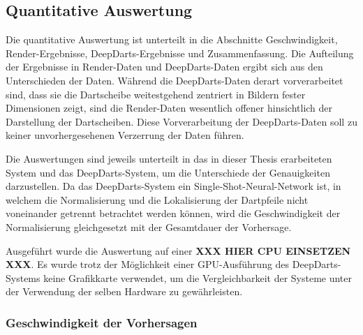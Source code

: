 
\subsection{Quantitative Auswertung}
\label{sec:cv_quantitative_auswertung}

Die quantitative Auswertung ist unterteilt in die Abschnitte Geschwindigkeit, Render-Ergebnisse, DeepDarts-Ergebnisse und Zusammenfassung. Die Aufteilung der Ergebnisse in Render-Daten und DeepDarts-Daten ergibt sich aus den Unterschieden der Daten. Während die DeepDarts-Daten derart vorverarbeitet sind, dass sie die Dartscheibe weitestgehend zentriert in Bildern fester Dimensionen zeigt, sind die Render-Daten wesentlich offener hinsichtlich der Darstellung der Dartscheiben. Diese Vorverarbeitung der DeepDarts-Daten soll zu keiner unvorhergesehenen Verzerrung der Daten führen.

Die Auswertungen sind jeweils unterteilt in das in dieser Thesis erarbeiteten System und das DeepDarts-System, um die Unterschiede der Genauigkeiten darzustellen. Da das DeepDarts-System ein Single-Shot-Neural-Network ist, in welchem die Normalisierung und die Lokalisierung der Dartpfeile nicht voneinander getrennt betrachtet werden können, wird die Geschwindigkeit der Normalisierung gleichgesetzt mit der Gesamtdauer der Vorhersage.

Ausgeführt wurde die Auswertung auf einer \textbf{XXX HIER CPU EINSETZEN XXX}. Es wurde trotz der Möglichkeit einer GPU-Ausführung des DeepDarts-Systems keine Grafikkarte verwendet, um die Vergleichbarkeit der Systeme unter der Verwendung der selben Hardware zu gewährleisten.


\subsubsection{Geschwindigkeit der Vorhersagen} %

\ExecutionTimes

